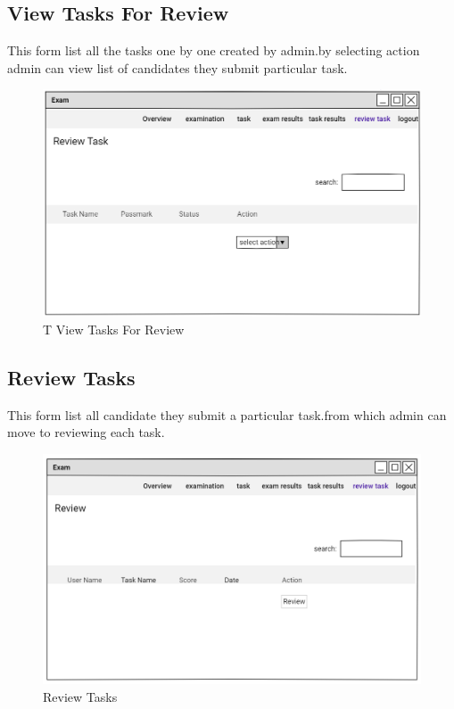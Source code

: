 \documentclass[a4paper,12pt]{report}
\begin{document}
\subsection { View Tasks For  Review}
This form list all the tasks one by one created by admin.by selecting action admin can view list of candidates they submit particular task.
\begin{figure}[bph]
	\centering
	\includegraphics[width=.8\linewidth]{img/admin/rvwtask1}
	\caption{T View Tasks For  Review}
\end{figure}

\pagebreak
\subsection {   Review  Tasks}
This form list all candidate they submit a particular task.from which admin can move to reviewing each task.
\begin{figure}[bph]
	\centering
	\includegraphics[width=.8\linewidth]{img/admin/rvwtsk2}
	\caption{Review  Tasks}
\end{figure}

\pagebreak
\end{document}

